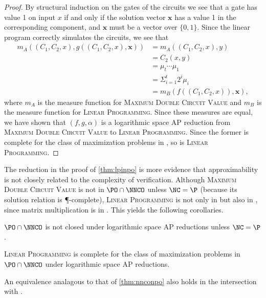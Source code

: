 \documentclass[]{article}
\begin{document}
\begin{proof}
  By structural induction on the gates of the circuits we see that a gate has value 1 on input $x$ if and only if the solution vector $\mathbf{x}$ has a value 1 in the corresponding component, and $\mathbf{x}$ must be a vector over $\{0, 1\}$.
  Since the linear program correctly simulates the circuits, we see that
  \begin{align*}
    m_A((C_1, C_2, x), g((C_1, C_2, x), \mathbf{x})) & = m_A((C_1, C_2, x), y) \\
    & = C_2(x, y) \\
    & = \mu_t \dotsb \mu_1 \\
    & = \Sigma^t_{i = 1} 2^i \mu_i \\
    & = m_B(f((C_1, C_2, x)), \mathbf{x}),
  \end{align*}
  where $m_A$ is the measure function for \textsc{Maximum Double Circuit Value} and $m_B$ is the measure function for \textsc{Linear Programming}.
  Since these measures are equal, we have shown that $(f, g, \alpha)$ is a logarithmic space AP reduction from \textsc{Maximum Double Circuit Value} to \textsc{Linear Programming}.
  Since the former is complete for the class of maximization problems in \PO, so is \textsc{Linear Programming}.
\end{proof}

The reduction in the proof of \autoref{thm:lpinpo} is more evidence that approximability is not closely related to the complexity of verification.
Although \textsc{Maximum Double Circuit Value} is not in $\PO \cap \NNCO$ unless $\NC = \P$ (because its solution relation is \P-complete), \textsc{Linear Programming} is not only in \PO{} but also in \NNCO, since matrix multiplication is in \NC.
This yields the following corollaries.

\begin{corollary}
  $\PO \cap \NNCO$ is not closed under logarithmic space AP reductions unless $\NC = \P$.
\end{corollary}

\begin{corollary}\label{cor:lpishard}
  \textsc{Linear Programming} is complete for the class of maximization problems in $\PO \cap \NNCO$ under logarithmic space AP reductions.
\end{corollary}

An equivalence analagous to that of \autoref{thm:nnconpo} also holds in the intersection with \PO.
\end{document}
